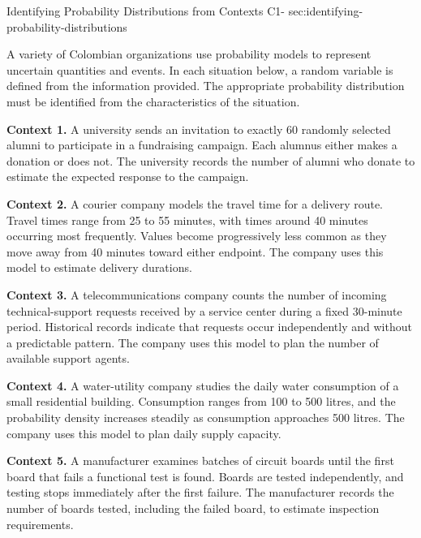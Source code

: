 	
	\sectionScored
	{Identifying Probability Distributions from Contexts}
	{C1-}
	{sec:identifying-probability-distributions}
	{
		A variety of Colombian organizations use probability models to represent
		uncertain quantities and events. In each situation below, a random
		variable is defined from the information provided. The appropriate
		probability distribution must be identified from the characteristics
		of the situation.
		
		
		\textbf{Context 1.} A university sends an invitation to exactly
		60 randomly selected alumni to participate in a fundraising campaign.
		Each alumnus either makes a donation or does not. The university records
		the number of alumni who donate to estimate the expected response to
		the campaign.
		
		\textbf{Context 2.} A courier company models the travel time for a
		delivery route. Travel times range from 25 to 55 minutes, with times
		around 40 minutes occurring most frequently. Values become progressively
		less common as they move away from 40 minutes toward either endpoint.
		The company uses this model to estimate delivery durations.
		
		\textbf{Context 3.} A telecommunications company counts the number of
		incoming technical-support requests received by a service center during
		a fixed 30-minute period. Historical records indicate that requests
		occur independently and without a predictable pattern. The company uses
		this model to plan the number of available support agents.
		
		\textbf{Context 4.} A water-utility company studies the daily water
		consumption of a small residential building. Consumption ranges from
		100 to 500 litres, and the probability density increases steadily as
		consumption approaches 500 litres. The company uses this model to plan
		daily supply capacity.
		
		\textbf{Context 5.} A manufacturer examines batches of circuit boards
		until the first board that fails a functional test is found. Boards are
		tested independently, and testing stops immediately after the first
		failure. The manufacturer records the number of boards tested, including
		the failed board, to estimate inspection requirements.
		
}
